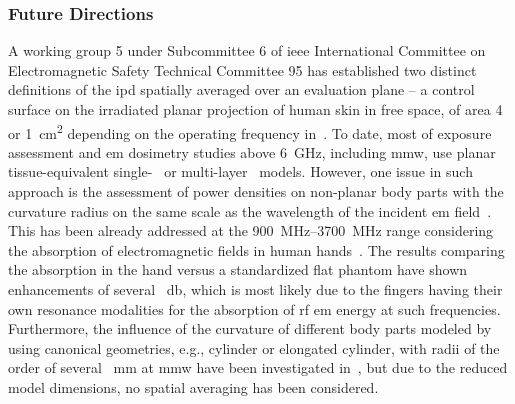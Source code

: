\subsubsection*{Future Directions}
A working group 5 under Subcommittee 6 of \gls{ieee} International Committee on Electromagnetic Safety Technical Committee 95 has established two distinct definitions of the \gls{ipd} spatially averaged over an evaluation plane -- a control surface on the irradiated planar projection of human skin in free space, of area \SI{4}{} or \SI{1}{\cm\squared} depending on the operating frequency in~\cite{IEEE2021Guide}.
To date, most of exposure assessment and \gls{em} dosimetry studies above \SI{6}{\GHz}, including \gls{mmw}, use planar tissue-equivalent single-~\cite{Nakae2020Skin,Poljak2018On,Poljak2020Assessment,Ziane2020Antenna,Kapetanovic2021Application} or multi-layer~\cite{Wu2015Safe,Wu2015human,Foster2018Thermal,Ziskin2018Tissue,He2018RF,Carrasco2019Exposure,Diao2021Effect,Li2021Quantitative} models.
However, one issue in such approach is the assessment of power densities on non-planar body parts with the curvature radius on the same scale as the wavelength of the incident \gls{em} field~\cite{Sacco2022Exposure,Kapetanovic2022Assessment,Kapetanovic2022AssessmentJERM}.
This has been already addressed at the \SIrange[range-units=single,range-phrase=--]{900}{3700}{\MHz} range considering the absorption of electromagnetic fields in human hands~\cite{Li2012Mechanisms}.
The results comparing the absorption in the hand versus a standardized flat phantom have shown enhancements of several \SI{}{\decibel}, which is most likely due to the fingers having their own resonance modalities for the absorption of \gls{rf} \gls{em} energy at such frequencies.
Furthermore, the influence of the curvature of different body parts modeled by using canonical geometries, e.g., cylinder or elongated cylinder, with radii of the order of several \SI{}{\mm} at \gls{mmw} have been investigated in~\cite{Sacco2022Exposure}, but due to the reduced model dimensions, no spatial averaging has been considered.

